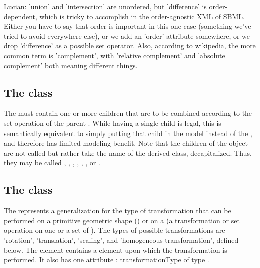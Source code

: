 {\color{red} Lucian: \notice 'union' and 'intersection' are unordered, but 'difference' is order-dependent, which is tricky to accomplish in the order-agnostic XML of SBML.  Either you have to say that order is important in this one case (something we've tried to avoid everywhere else), or we add an 'order' attribute somewhere, or we drop 'difference' as a possible set operator.  Also, according to wikipedia, the more common term is 'complement', with 'relative complement' and 'absolute complement' both meaning different things.}


\subsection{The  class}
\label{ListOfCSGNodes-class}
The \ListOfCSGNodes must contain one or more  children that are to be combined according to the set operation of the parent \CSGSetOperator.  While having a single child is legal, this is semantically equivalent to simply putting that child in the model instead of the \CSGSetOperator, and therefore has limited modeling benefit.  Note that the children of the \ListOfCSGNodes object are not called  but rather take the name of the derived class, decapitalized.  Thus, they may be called , , , , , , or .


\subsection{The  class}
\label{CSGTransformation-class}
The \CSGTransformation represents a generalization for the type of transformation that can be performed on a primitive geometric shape (\CSGPrimitive) or on a \CSGNode (a transformation or set operation on one or a set of \CSGPrimitives). The types of possible transformations are 'rotation', 'translation', 'scaling', and 'homogeneous transformation', defined below. The \CSGTransformation element contains a \CSGNode element upon which the transformation is performed. It also has one attribute : transformationType of type . 

